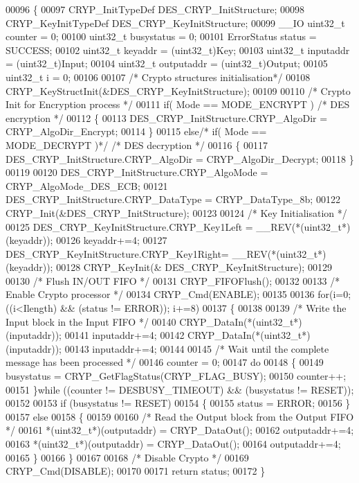 \begin{DoxyCode}
00096 \{
00097   CRYP_InitTypeDef DES\_CRYP\_InitStructure;
00098   CRYP_KeyInitTypeDef DES\_CRYP\_KeyInitStructure;
00099   \_\_IO uint32\_t counter = 0;
00100   uint32\_t busystatus = 0;
00101   ErrorStatus status = SUCCESS;
00102   uint32\_t keyaddr    = (uint32\_t)Key;
00103   uint32\_t inputaddr  = (uint32\_t)Input;
00104   uint32\_t outputaddr = (uint32\_t)Output;
00105   uint32\_t i = 0;
00106 
00107   \textcolor{comment}{/* Crypto structures initialisation*/}
00108   CRYP_KeyStructInit(&DES\_CRYP\_KeyInitStructure);
00109 
00110   \textcolor{comment}{/* Crypto Init for Encryption process */}
00111   \textcolor{keywordflow}{if}( Mode == MODE_ENCRYPT ) \textcolor{comment}{/* DES encryption */}
00112   \{
00113      DES\_CRYP\_InitStructure.CRYP_AlgoDir  = CRYP_AlgoDir_Encrypt;
00114   \}
00115   \textcolor{keywordflow}{else}\textcolor{comment}{/* if( Mode == MODE\_DECRYPT )*/} \textcolor{comment}{/* DES decryption */}
00116   \{      
00117      DES\_CRYP\_InitStructure.CRYP_AlgoDir  = CRYP_AlgoDir_Decrypt;
00118   \}
00119 
00120   DES\_CRYP\_InitStructure.CRYP_AlgoMode = CRYP_AlgoMode_DES_ECB;
00121   DES\_CRYP\_InitStructure.CRYP_DataType = CRYP_DataType_8b;
00122   CRYP_Init(&DES\_CRYP\_InitStructure);
00123 
00124   \textcolor{comment}{/* Key Initialisation */}
00125   DES\_CRYP\_KeyInitStructure.CRYP_Key1Left = \_\_REV(*(uint32\_t*)(keyaddr));
00126   keyaddr+=4;
00127   DES\_CRYP\_KeyInitStructure.CRYP_Key1Right= \_\_REV(*(uint32\_t*)(keyaddr));
00128   CRYP_KeyInit(& DES\_CRYP\_KeyInitStructure);
00129 
00130   \textcolor{comment}{/* Flush IN/OUT FIFO */}
00131   CRYP_FIFOFlush();
00132 
00133   \textcolor{comment}{/* Enable Crypto processor */}
00134   CRYP_Cmd(ENABLE);
00135 
00136   \textcolor{keywordflow}{for}(i=0; ((i<Ilength) && (status != ERROR)); i+=8)
00137   \{
00138 
00139     \textcolor{comment}{/* Write the Input block in the Input FIFO */}
00140     CRYP_DataIn(*(uint32\_t*)(inputaddr));
00141     inputaddr+=4;
00142     CRYP_DataIn(*(uint32\_t*)(inputaddr));
00143     inputaddr+=4;
00144 
00145 \textcolor{comment}{/* Wait until the complete message has been processed */}
00146     counter = 0;
00147     \textcolor{keywordflow}{do}
00148     \{
00149       busystatus = CRYP_GetFlagStatus(CRYP_FLAG_BUSY);
00150       counter++;
00151     \}\textcolor{keywordflow}{while} ((counter != DESBUSY_TIMEOUT) && (busystatus != RESET));
00152 
00153     \textcolor{keywordflow}{if} (busystatus != RESET)
00154    \{
00155        status = ERROR;
00156     \}
00157     \textcolor{keywordflow}{else}
00158     \{
00159 
00160       \textcolor{comment}{/* Read the Output block from the Output FIFO */}
00161       *(uint32\_t*)(outputaddr) = CRYP_DataOut();
00162       outputaddr+=4;
00163       *(uint32\_t*)(outputaddr) = CRYP_DataOut();
00164       outputaddr+=4;
00165     \}
00166   \}
00167 
00168   \textcolor{comment}{/* Disable Crypto */}
00169   CRYP_Cmd(DISABLE);
00170 
00171   \textcolor{keywordflow}{return} status; 
00172 \}
\end{DoxyCode}
